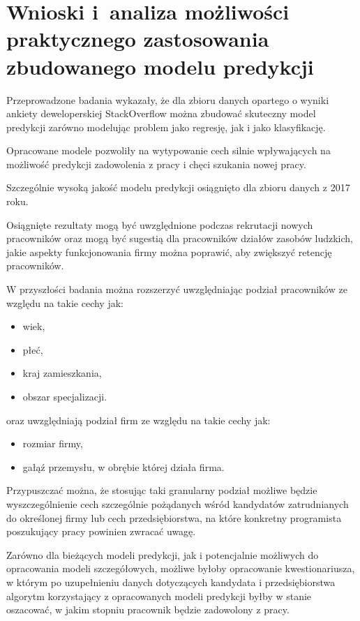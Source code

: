 \section{Wnioski i~analiza możliwości praktycznego zastosowania zbudowanego modelu predykcji}\label{sec:analysis:model-fitness}

Przeprowadzone badania wykazały, że dla zbioru danych opartego o wyniki ankiety deweloperskiej StackOverflow \cite{so-survey-info}
można zbudować skuteczny model predykcji zarówno modelując problem jako regresję, jak i jako klasyfikację.

Opracowane modele pozwoliły na wytypowanie cech silnie wpływających na możliwość predykcji zadowolenia z pracy i chęci szukania nowej pracy.

Szczególnie wysoką jakość modelu predykcji osiągnięto dla zbioru danych z 2017 roku.

Osiągnięte rezultaty mogą być uwzględnione podczas rekrutacji nowych pracowników
oraz mogą być sugestią dla pracowników działów zasobów ludzkich, jakie aspekty funkcjonowania firmy można poprawić, aby zwiększyć retencję pracowników.

W przyszłości badania można rozszerzyć uwzględniając podział pracowników ze względu na takie cechy jak:

\begin{itemize}
    \item wiek,
    \item płeć,
    \item kraj zamieszkania,
    \item obszar specjalizacji.
\end{itemize}

oraz uwzględniają podział firm ze względu na takie cechy jak:

\begin{itemize}
    \item rozmiar firmy,
    \item gałąź przemysłu, w obrębie której działa firma.
\end{itemize}

Przypuszczać można, że stosując taki granularny podział możliwe będzie wyszczególnienie cech szczególnie pożądanych wśród kandydatów zatrudnianych do określonej firmy
lub cech przedsiębiorstwa, na które konkretny programista poszukujący pracy powinien zwracać uwagę.

Zarówno dla bieżących modeli predykcji, jak i potencjalnie możliwych do opracowania modeli szczegółowych,
możliwe byłoby opracowanie kwestionariusza, w którym po uzupełnieniu danych dotyczących kandydata i przedsiębiorstwa
algorytm korzystający z opracowanych modeli predykcji byłby w stanie oszacować, w jakim stopniu pracownik będzie zadowolony z pracy.

\thispagestyle{normal}

